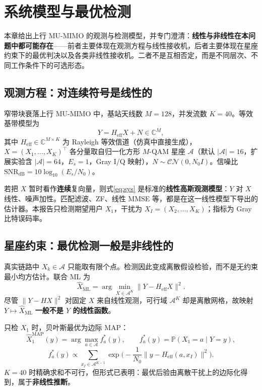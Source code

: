 \chapter{系统模型与最优检测}
\label{ch:model}

本章给出上行 MU-MIMO 的观测与检测模型，并专门澄清：\textbf{线性与非线性在本问题中都可能存在}——前者主要体现在观测方程与线性接收机，后者主要体现在星座约束下的最优判决以及各类非线性接收机。二者不是互相否定，而是不同层次、不同工作条件下的可选形态。

\section{观测方程：对连续符号是线性的}

窄带块衰落上行 MU-MIMO 中，基站天线数 $M=128$，并发流数 $K=40$。等效基带模型为
\begin{equation}
Y = H_{\mathrm{eff}} X + N \in \mathbb{C}^{M},
\label{eq:sys}
\end{equation}
其中 $H_{\mathrm{eff}}\in\mathbb{C}^{M\times K}$ 为 Rayleigh 等效信道（仿真中直接生成），$X=(X_1,\ldots,X_K)^\top$ 各分量取自归一化方形 $M$-QAM 星座 $\mathcal{A}$（默认 $|\mathcal{A}|=16$，扩展实验含 $|\mathcal{A}|=64$，$E_s=1$，Gray I/Q 映射），$N\sim\mathcal{CN}(0,N_0 I)$。信噪比 $\mathrm{SNR}_{\mathrm{dB}}=10\log_{10}(E_s/N_0)$。

若把 $X$ 暂时看作\textbf{连续}复向量，则式\eqref{eq:sys} 是标准的\textbf{线性高斯观测模型}：$Y$ 对 $X$ 线性、噪声加性。匹配滤波、ZF、线性 MMSE 等，都是在这一线性模型下导出的估计器。本报告只检测期望用户 $X_1$，干扰为 $X_I=(X_2,\ldots,X_K)$；指标为 Gray 比特误码率。

\section{星座约束：最优检测一般是非线性的}

真实链路中 $X_k\in\mathcal{A}$ 只能取有限个点。检测因此变成离散假设检验，而不是无约束最小均方估计。联合 ML 为
\begin{equation}
\hat X_{\mathrm{ML}}
=\arg\min_{X\in\mathcal{A}^K}\|Y-H_{\mathrm{eff}}X\|^2.
\end{equation}
尽管 $\|Y-HX\|^2$ 对固定 $X$ 来自线性观测，可行域 $\mathcal{A}^K$ 却是离散网格，故映射 $Y\mapsto\hat X_{\mathrm{ML}}$ \textbf{一般不是 $Y$ 的线性函数}。

只检 $X_1$ 时，贝叶斯最优为边际 MAP：
\begin{equation}
\hat X_1^{\mathrm{MAP}}(y)=\arg\max_{a\in\mathcal{A}} f_a^*(y),\qquad
f_a^*(y)=\mathbb{P}(X_1=a\mid Y=y),
\end{equation}
\begin{equation}
f_a^*(y)\propto \sum_{x_I\in\mathcal{A}^{K-1}}
\exp\Big(-\frac{1}{N_0}\big\|y-H_{\mathrm{eff}}(a,x_I)\big\|^2\Big).
\label{eq:fstar}
\end{equation}
$K=40$ 时精确求和不可行，但形式已表明：最优后验由离散干扰上的边际化得到，属于\textbf{非线性推断}。

